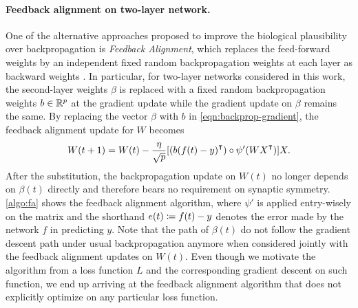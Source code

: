 \paragraph{Feedback alignment on two-layer network.}

One of the alternative approaches proposed to improve the biological plausibility over backpropagation is \emph{Feedback Alignment}, which replaces the feed-forward weights by an independent fixed random backpropagation weights at each layer as backward weights \citep{lillicrap2016random}. In particular, for two-layer networks considered in this work, the second-layer weights $\beta$ is replaced with a fixed random backpropagation weights $b\in{\mathbb{R}^{p}}$ at the gradient update while the gradient update on $\beta$ remains the same. By replacing the vector $\beta$ with $b$ in \cref{eqn:backprop-gradient}, the feedback alignment update for $W$ becomes
\begin{align}\label{eqn:alignment-update}
    W(t+1) = W(t) - \frac{\eta}{\sqrt{p}} [(b (f(t) - y)\transpose)\circ \psi'(WX\transpose)] X.
\end{align}
After the substitution, the backpropagation update on $W(t)$ no longer depends on $\beta(t)$ directly and therefore bears no requirement on synaptic symmetry. \cref{algo:fa} shows the feedback alignment algorithm, where $\psi'$ is applied entry-wisely on the matrix and the shorthand $e(t) \coloneqq f(t) -y$ denotes the error made by the network $f$ in predicting $y$. Note that the path of $\beta(t)$ do not follow the gradient descent path under usual backpropagation anymore when considered jointly with the feedback alignment updates on $W(t)$. Even though we motivate the algorithm from a loss function $L$ and the corresponding gradient descent on such function, we end up arriving at the feedback alignment algorithm that does not explicitly optimize on any particular loss function.

